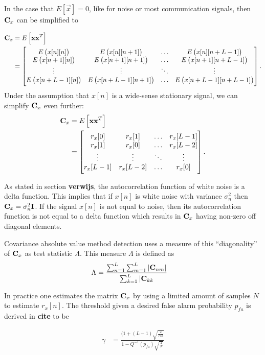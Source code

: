 \documentclass[a4paper, openany, oneside]{memoir}
\begin{document}
In the case that $E\left[\vec{x}\right]=0$, like for noise or most communication signals, then $\boldsymbol{\mathbf{C}}_x$ can be simplified to

\begin{align*}
\boldsymbol{\mathbf{C}}_x &= E\left[\boldsymbol{\mathbf{x}}\boldsymbol{\mathbf{x}}^T\right] \\
&= \begin{bmatrix} 
E\left(x[n][n]\right) & E\left(x[n][n+1]\right) & \ldots & E\left(x[n][n+L-1]\right) \\
E\left(x[n+1][n]\right) & E\left(x[n+1][n+1]\right) & \ldots & E\left(x[n+1][n+L-1]\right) \\
\vdots & \vdots & \ddots & \vdots \\
E\left(x[n+L-1][n]\right) & E\left(x[n+L-1][n+1]\right) & \ldots & E\left(x[n+L-1][n+L-1]\right) \\
\end{bmatrix}.
\end{align*}
Under the assumption that $x[n]$ is a wide-sense stationary signal, we can simplify $\boldsymbol{\mathbf{C}}_x$ even further:
\begin{align*}
\boldsymbol{\mathbf{C}}_x &= E\left[\boldsymbol{\mathbf{x}}\boldsymbol{\mathbf{x}}^T\right] \\
&= \begin{bmatrix} 
r_x[0] & r_x[1] & \ldots & r_x[L-1] \\
r_x[1] & r_x[0] & \ldots & r_x[L-2] \\
\vdots & \vdots & \ddots & \vdots \\
r_x[L-1] & r_x[L-2] & \ldots & r_x[0] \\
\end{bmatrix}.
\end{align*}

As stated in section \textbf{verwijs}, the autocorrelation function of white noise is a delta function. This implies that if $x[n]$ is white noise with variance $\sigma_n^2$ then $\boldsymbol{\mathbf{C}}_x = \sigma_n^2\boldsymbol{\mathbf{I}}$.
If the signal $x[n]$ is not equal to noise, then its autocorrelation function is not equal to a delta function which results in $\boldsymbol{\mathbf{C}}_x$ having non-zero off diagonal elements.

Covariance absolute value method detection uses a measure of this ``diagonality'' of $\boldsymbol{\mathbf{C}}_x$ as test statistic $\Lambda$.
This measure $\Lambda$ is defined as
\begin{align*}
\Lambda &= \frac{\sum_{n=1}^{L} \sum_{m=1}^L \left|\boldsymbol{\mathbf{C}}_{nm}\right|}{\sum_{k=1}^L |\boldsymbol{\mathbf{C}}_{kk}}
\end{align*} 

In practice one estimates the matrix $\boldsymbol{\mathbf{C}}_x$ by using a limited amount of samples $N$ to estimate $r_x[n]$. The threshold given a desired false alarm probability
$p_{fa}$ is derived in \textbf{cite} to be

\begin{align*}
\gamma &= \frac{(1+(L-1)\sqrt{\frac{2}{N\pi}}}{1-Q^{-1}(p_{fa})\sqrt{\frac{2}{N}}}
\end{align*} 



\end{document}
